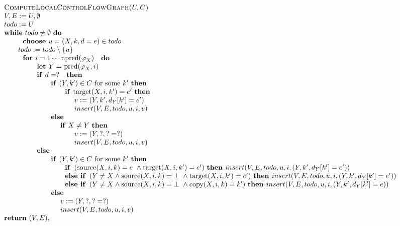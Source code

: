 \begin{equation*}
\begin{tabular}{l}
\textsc{ComputeLocalControlFlowGraph(}$U,C$\textsc{)} \\ 
$V,E:=U,\emptyset $ \\ 
$todo:=U$ \\ 
\textbf{while} $todo\neq \emptyset $ \textbf{do} \\ 
$\qquad \text{\textbf{choose }}u=(X,k,d=e)\in todo$ \\ 
$\qquad todo:=todo\setminus \{u\}$ \\ 
$\qquad \text{\textbf{for }}i=1\cdots \mathrm{npred}(\varphi _{X})\text{ 
\textbf{do}}$ \\ 
$\qquad \qquad \text{\textbf{let }}Y=$ $\mathrm{pred}(\varphi _{X},i)$ \\ 
$\qquad \qquad \text{\textbf{if }}d=?$ $\text{\textbf{then}}$ \\ 
$\qquad \qquad \qquad \text{\textbf{if }}(Y,k^{\prime })\in C$ for some $%
k^{\prime }$ \textbf{then} \\ 
$\qquad \qquad \qquad \qquad \text{\textbf{if }}\mathrm{target}%
(X,i,k^{\prime })=e^{\prime }$ \textbf{then} \\ 
$\qquad \qquad \qquad \qquad \qquad v:=(Y,k^{\prime },d_{Y}[k^{\prime
}]=e^{\prime })$ \\ 
$\qquad \qquad \qquad \qquad \qquad insert(V,E,todo,u,i,v)$ \\ 
$\qquad \qquad \qquad \text{\textbf{else}}$ \\ 
$\qquad \qquad \qquad \qquad $\textbf{if} $X\neq Y$ \textbf{then} \\ 
$\qquad \qquad \qquad \qquad \qquad v:=(Y,?,?=?)$ \\ 
$\qquad \qquad \qquad \qquad \qquad insert(V,E,todo,u,i,v)$ \\ 
$\qquad \qquad \text{\textbf{else}}$ \\ 
$\qquad \qquad \qquad \text{\textbf{if }}(Y,k^{\prime })\in C$ for some $%
k^{\prime }$ \textbf{then} \\ 
$\qquad \qquad \qquad \qquad \text{\textbf{if }}\left( \mathrm{source}%
(X,i,k)=e\mathbf{\ }\wedge \mathrm{target}(X,i,k^{\prime })=e^{\prime
}\right) $ \textbf{then }$insert(V,E,todo,u,i,(Y,k^{\prime },d_{Y}[k^{\prime
}]=e^{\prime }))$ \\ 
$\qquad \qquad \qquad \qquad \text{\textbf{else if} }\left( Y\neq X\wedge 
\mathrm{source}(X,i,k)=\bot \mathbf{\ }\wedge \mathrm{target}(X,i,k^{\prime
})=e^{\prime }\right) $ \textbf{then }$insert(V,E,todo,u,i,(Y,k^{\prime
},d_{Y}[k^{\prime }]=e^{\prime }))$ \\ 
$\qquad \qquad \qquad \qquad \text{\textbf{else if} }\left( Y\neq X\wedge 
\mathrm{source}(X,i,k)=\bot \mathbf{\ }\wedge \mathrm{copy}(X,i,k)=k^{\prime
}\right) $ \textbf{then }$insert(V,E,todo,u,i,(Y,k^{\prime },d_{Y}[k^{\prime
}]=e))$ \\ 
$\qquad \qquad \qquad \text{\textbf{else}}$ \\ 
$\qquad \qquad \qquad \qquad v:=(Y,?,?=?)$ \\ 
$\qquad \qquad \qquad \qquad insert(V,E,todo,u,i,v)\qquad $ \\ 
\textbf{return} $(V,E),$%
\end{tabular}%
\end{equation*}%
